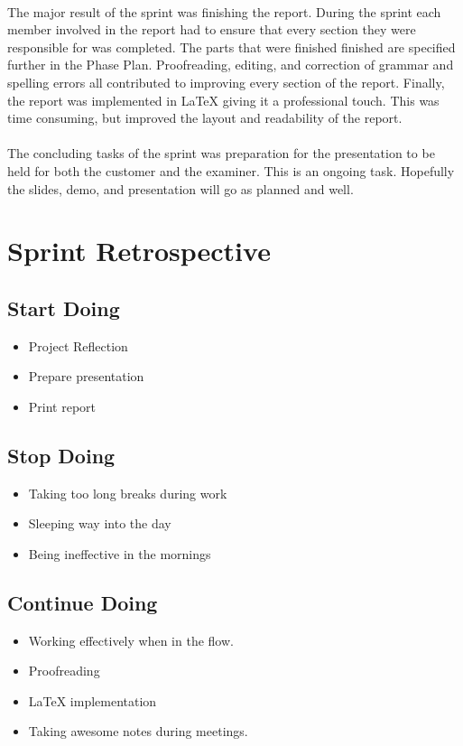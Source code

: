 \paragraph{} The major result of the sprint was finishing the report. During the sprint each member involved in the report had to ensure that every section they were responsible for was completed. The parts that were finished finished are specified further in the Phase Plan. Proofreading, editing, and correction of grammar and spelling errors all contributed to improving every section of the report. Finally, the report was implemented in LaTeX giving it a professional touch. This was time consuming, but improved the layout and readability of the report.

\paragraph{} The concluding tasks of the sprint was preparation for the presentation to be held for both the customer and the examiner. This is an ongoing task. Hopefully the slides, demo, and presentation will go as planned and well.


\section{Sprint Retrospective}
\label{sec:FinalRetrospective}

\subsection{Start Doing}
\begin{itemize}
\item Project Reflection
\item Prepare presentation
\item Print report
\end{itemize}

\subsection{Stop Doing}
\begin{itemize}
\item Taking too long breaks during work
\item Sleeping way into the day
\item Being ineffective in the mornings
\end{itemize}

\subsection{Continue Doing}
\begin{itemize}
\item Working effectively when in the flow.
\item Proofreading
\item LaTeX implementation
\item Taking awesome notes during meetings. 
\end{itemize}

